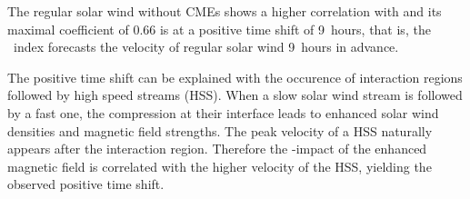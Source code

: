 % 
The regular solar wind without CMEs shows a higher correlation with \Kp{} and its maximal coefficient of 0.66 is at a positive time shift of 9~hours, that is, the \Kp~index forecasts the velocity of regular solar wind 9~hours in advance.

The positive time shift can be explained with the occurence of interaction regions followed by high speed streams (HSS). When a slow solar wind stream is followed by a fast one, the compression at their interface leads to enhanced solar wind densities and magnetic field strengths. The peak velocity of a HSS naturally appears after the interaction region. Therefore the \Kp-impact of the enhanced magnetic field is correlated with the higher velocity of the HSS, yielding the observed positive time shift.\\


